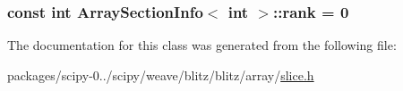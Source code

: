 \subsubsection[{rank}]{\setlength{\rightskip}{0pt plus 5cm}const int {\bf Array\+Section\+Info}$<$ int $>$\+::rank = 0\hspace{0.3cm}{\ttfamily [static]}}\label{classArraySectionInfo_3_01int_01_4_a2f5850b154908dcae6a09d2eed13f322}


The documentation for this class was generated from the following file\+:\begin{DoxyCompactItemize}
\item 
packages/scipy-\/0../scipy/weave/blitz/blitz/array/\hyperlink{slice_8h}{slice.\+h}\end{DoxyCompactItemize}
